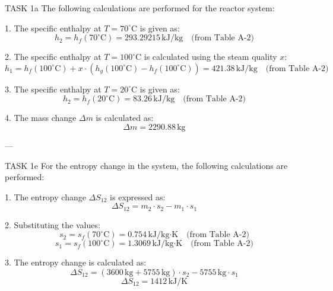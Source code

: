 TASK 1a  
The following calculations are performed for the reactor system:

1. The specific enthalpy at \( T = 70^\circ\text{C} \) is given as:  
\[
h_2 = h_f(70^\circ\text{C}) = 293.29215 \, \text{kJ/kg} \quad \text{(from Table A-2)}
\]

2. The specific enthalpy at \( T = 100^\circ\text{C} \) is calculated using the steam quality \( x \):  
\[
h_1 = h_f(100^\circ\text{C}) + x \cdot (h_g(100^\circ\text{C}) - h_f(100^\circ\text{C})) = 421.38 \, \text{kJ/kg} \quad \text{(from Table A-2)}
\]

3. The specific enthalpy at \( T = 20^\circ\text{C} \) is given as:  
\[
h_2 = h_f(20^\circ\text{C}) = 83.26 \, \text{kJ/kg} \quad \text{(from Table A-2)}
\]

4. The mass change \( \Delta m \) is calculated as:  
\[
\Delta m = 2290.88 \, \text{kg}
\]

---

TASK 1e  
For the entropy change in the system, the following calculations are performed:

1. The entropy change \( \Delta S_{12} \) is expressed as:  
\[
\Delta S_{12} = m_2 \cdot s_2 - m_1 \cdot s_1
\]

2. Substituting the values:  
\[
s_2 = s_f(70^\circ\text{C}) = 0.754 \, \text{kJ/kg·K} \quad \text{(from Table A-2)}
\]
\[
s_1 = s_f(100^\circ\text{C}) = 1.3069 \, \text{kJ/kg·K} \quad \text{(from Table A-2)}
\]

3. The entropy change is calculated as:  
\[
\Delta S_{12} = (3600 \, \text{kg} + 5755 \, \text{kg}) \cdot s_2 - 5755 \, \text{kg} \cdot s_1
\]
\[
\Delta S_{12} = 1412 \, \text{kJ/K}
\]